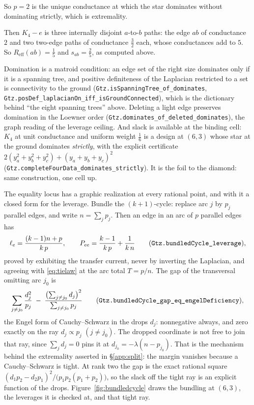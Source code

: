 So $p=2$ is the unique conductance at which the star dominates without
dominating strictly, which is extremality.

Then $K_4-e$ is three internally disjoint $a$-to-$b$ paths:
the edge $ab$ of conductance $2$ and two two-edge paths of conductance
$\tfrac32$ each, whose conductances add to $5$.  So
$R_{\mathrm{eff}}(ab)=\tfrac15$ and $s_{ab}=\tfrac25$, as computed
above.

Domination is a matroid condition: an edge set of the right size dominates
only if it is a spanning tree, and positive definiteness of the Laplacian
restricted to a
set is connectivity to the ground
(\texttt{Gtz.is\allowbreak Spanning\allowbreak Tree\_of\_dominates},
\texttt{Gtz.pos\allowbreak Def\_laplacian\allowbreak On\_iff\_is\allowbreak Ground\allowbreak Connected}), which is the
dictionary behind ``the eight spanning trees'' above.  Deleting a light edge
preserves domination in the Loewner order
(\texttt{Gtz.dominates\_of\_deleted\_dominates}), the graph reading of the
leverage ceiling.  And slack is available at the binding cell: $K_4$ at unit
conductance and uniform weight $\tfrac16$ is a design at $(6,3)$ whose star
at the ground dominates \emph{strictly}, with the explicit certificate
$2(y_a^2+y_b^2+y_c^2)+(y_a+y_b+y_c)^2$
(\texttt{Gtz.complete\allowbreak Four\allowbreak Data\_dominates\_strictly}).  It is the foil to the
diamond: same construction, one cell up.

The equality locus has a graphic realization at every rational point, and
with it a closed form for the leverage.  Bundle the $(k+1)$-cycle: replace
arc $j$ by $p_j$ parallel edges, and write $n=\sum_jp_j$.  Then an edge in
an arc of $p$ parallel edges has
\[
  \ell_e=\frac{(k-1)n+p}{k\,p},
  \qquad
  P_{ee}=\frac{k-1}{k\,p}+\frac{1}{k\,n}
  \qquad\text{(\texttt{Gtz.bundled\allowbreak Cycle\_leverage})},
\]
proved by exhibiting the transfer current, never by inverting the Laplacian,
and agreeing with \eqref{eq:tielaw} at the arc total $T=p/n$.  The gap of
the transversal omitting arc $j_0$ is
\[
  \sum_{j\ne j_0}\frac{d_j^2}{p_j}
  \;-\;\frac{\bigl(\sum_{j\ne j_0}d_j\bigr)^2}{\sum_{j\ne j_0}p_j}
  \qquad\text{(\texttt{Gtz.bundled\allowbreak Cycle\_gap\_eq\_engel\allowbreak Deficiency})},
\]
the Engel form of Cauchy--Schwarz in the drops $d_j$: nonnegative always,
and zero exactly on the ray $d_j\propto p_j$ $(j\ne j_0)$.  The dropped
coordinate is not free to join that ray, since $\sum_jd_j=0$ pins it at
$d_{j_0}=-\lambda(n-p_{j_0})$.  That is the mechanism behind
the extremality asserted in \S\ref{app:split}: the margin vanishes
because a Cauchy--Schwarz is tight.
At rank two the gap is the exact rational square
$(d_1p_2-d_2p_1)^2/\bigl(p_1p_2(p_1+p_2)\bigr)$, so the slack off the tight
ray is an explicit function of the drops.  Figure~\ref{fig:bundledcycle} draws
the bundling at $(6,3)$, the leverages it is checked at, and that tight ray.

